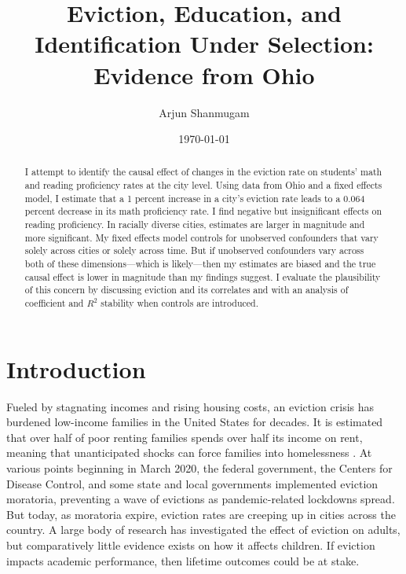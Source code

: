 \documentclass[12pt]{article}
\begin{document}
\begin{titlepage}
\title{Eviction, Education, and Identification Under Selection: Evidence from Ohio}
\author{Arjun Shanmugam}
\date{\today}
\maketitle
\begin{abstract}
\noindent I attempt to identify the causal effect of changes in the eviction rate on students' math and reading proficiency rates at the city level. Using data from Ohio and a fixed effects model, I estimate that a 1 percent increase in a city's eviction rate leads to a 0.064 percent decrease in its math proficiency rate. I find negative but insignificant effects on reading proficiency. In racially diverse cities, estimates are larger in magnitude and more significant. My fixed effects model controls for unobserved confounders that vary solely across cities or solely across time. But if unobserved confounders vary across both of these dimensions—which is likely—then my estimates are biased and the true causal effect is lower in magnitude than my findings suggest. I evaluate the plausibility of this concern by discussing eviction and its correlates and with an analysis of coefficient and $R^2$ stability when controls are introduced.\\

\bigskip
\end{abstract}
\setcounter{page}{0}
\thispagestyle{empty}
\end{titlepage}
\pagebreak \newpage




\doublespacing


\section{Introduction} \label{sec:introduction}
Fueled by stagnating incomes and rising housing costs, an eviction crisis has burdened low-income families in the United States for decades. It is estimated that over half of poor renting families spends over half its income on rent, meaning that unanticipated shocks can force families into homelessness \citep{desmond_evicted:_2017}. At various points beginning in March 2020, the federal government, the Centers for Disease Control, and some state and local governments implemented eviction moratoria, preventing a wave of evictions as pandemic-related lockdowns spread\citep{thrush_federal_2021, goldstein_landlords_2020}. But today, as moratoria expire, eviction rates are creeping up in cities across the country\citep{zaveri_after_2022}. A large body of research has investigated the effect of eviction on adults, but comparatively little evidence exists on how it affects children. If eviction impacts academic performance, then lifetime outcomes could be at stake.
\end{document}
